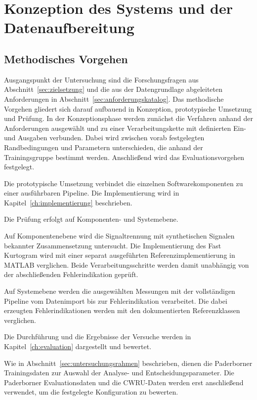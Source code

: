 \chapter{Konzeption des Systems und der Datenaufbereitung}
\label{ch:konzept}

\section{Methodisches Vorgehen}
\label{sec:methodisches_vorgehen}

Ausgangspunkt der Untersuchung sind die Forschungsfragen aus
Abschnitt~\ref{sec:zielsetzung} und die aus der Datengrundlage abgeleiteten
Anforderungen in Abschnitt~\ref{sec:anforderungskatalog}. Das methodische
Vorgehen gliedert sich darauf aufbauend in Konzeption, prototypische Umsetzung
und Prüfung. In der Konzeptionsphase werden zunächst die Verfahren anhand der
Anforderungen ausgewählt und zu einer Verarbeitungskette mit definierten
Ein- und Ausgaben verbunden. Dabei wird zwischen vorab festgelegten
Randbedingungen und Parametern unterschieden, die anhand der Trainingsgruppe
bestimmt werden. Anschließend wird das Evaluationsvorgehen festgelegt.

Die prototypische Umsetzung verbindet die einzelnen Softwarekomponenten zu
einer ausführbaren Pipeline. Die Implementierung wird in
Kapitel~\ref{ch:implementierung} beschrieben.

Die Prüfung erfolgt auf Komponenten- und Systemebene.

Auf Komponentenebene wird die Signaltrennung mit synthetischen Signalen
bekannter Zusammensetzung untersucht. Die Implementierung des Fast Kurtogram
wird mit einer separat ausgeführten Referenzimplementierung in MATLAB
verglichen. Beide Verarbeitungsschritte werden damit unabhängig von der
abschließenden Fehlerindikation geprüft.

Auf Systemebene werden die ausgewählten Messungen mit der vollständigen
Pipeline vom Datenimport bis zur Fehlerindikation verarbeitet. Die dabei
erzeugten Fehlerindikationen werden mit den dokumentierten Referenzklassen
verglichen.

Die Durchführung und die Ergebnisse der Versuche werden in
Kapitel~\ref{ch:evaluation} dargestellt und bewertet.


Wie in Abschnitt~\ref{sec:untersuchungsrahmen} beschrieben, dienen die
Paderborner Trainingsdaten zur Auswahl der Analyse- und
Entscheidungsparameter. Die Paderborner Evaluationsdaten und die CWRU-Daten
werden erst anschließend verwendet, um die festgelegte Konfiguration zu
bewerten.

